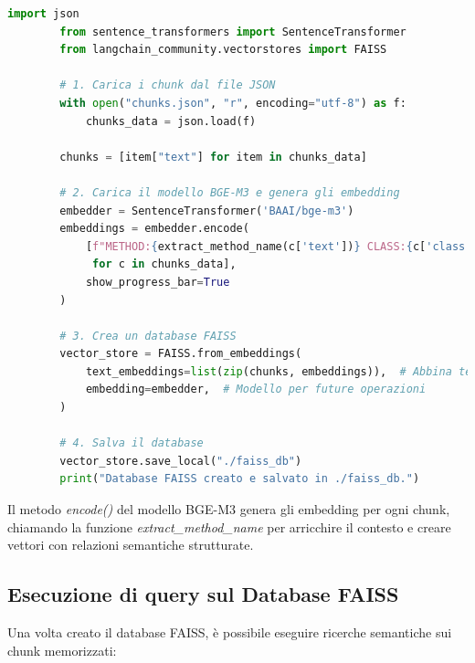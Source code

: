 \documentclass[12pt,a4paper,openright,twoside]{book}
\begin{document}
    \begin{lstlisting}[language=Python, caption={Codice Python per la generazione degli embedding e la creazione di un database FAISS}, label={lst:embeddings}]
        import json
        from sentence_transformers import SentenceTransformer
        from langchain_community.vectorstores import FAISS
        
        # 1. Carica i chunk dal file JSON
        with open("chunks.json", "r", encoding="utf-8") as f:
            chunks_data = json.load(f)
        
        chunks = [item["text"] for item in chunks_data]
        
        # 2. Carica il modello BGE-M3 e genera gli embedding
        embedder = SentenceTransformer('BAAI/bge-m3')
        embeddings = embedder.encode(
            [f"METHOD:{extract_method_name(c['text'])} CLASS:{c['class']} LINES:{c['start_line']}-{c['end_line']} CONTENT:{c['text']}" 
             for c in chunks_data],
            show_progress_bar=True
        )
        
        # 3. Crea un database FAISS
        vector_store = FAISS.from_embeddings(
            text_embeddings=list(zip(chunks, embeddings)),  # Abbina testi e embedding
            embedding=embedder,  # Modello per future operazioni
        )
        
        # 4. Salva il database
        vector_store.save_local("./faiss_db")
        print("Database FAISS creato e salvato in ./faiss_db.")
    \end{lstlisting}

Il metodo \emph{encode()} del modello BGE-M3 genera gli embedding per ogni chunk,
chiamando la funzione \emph{extract\_method\_name} per arricchire il contesto e creare vettori con relazioni semantiche strutturate.

\subsection{Esecuzione di query sul Database FAISS}
    Una volta creato il database FAISS, è possibile eseguire ricerche semantiche sui chunk memorizzati:
\end{document}
